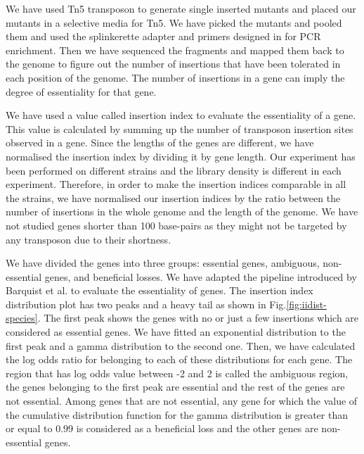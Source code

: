 \documentclass[12pt,letterpaper]{article}
\begin{document}
We have used Tn5 transposon to generate single inserted mutants and placed our mutants in a selective media for Tn5. We have picked the mutants and pooled them and used the splinkerette adapter and primers designed in \cite{barquist_tradis_2016} for PCR enrichment. Then we have sequenced the fragments and mapped them back to the genome to figure out the number of insertions that have been tolerated in each position of the genome. The number of insertions in a gene can imply the degree of essentiality for that gene.

We have used a value called insertion index to evaluate the essentiality of a gene. This value is calculated by summing up the number of transposon insertion sites observed in a gene. Since the lengths of the genes are different, we have normalised the insertion index by dividing it by gene length. Our experiment has been performed on different strains and the library density is different in each experiment. Therefore, in order to make the insertion indices comparable in all the strains, we have normalised our insertion indices by the ratio between the number of insertions in the whole genome and the length of the genome. We have not studied genes shorter than 100 base-pairs as they might not be targeted by any transposon due to their shortness. 

We have divided the genes into three groups: essential genes, ambiguous, non-essential genes, and beneficial losses. We have adapted the pipeline introduced by Barquist et al.\@ \cite{barquist_tradis_2016} to evaluate the essentiality of genes. The insertion index distribution plot has two peaks and a heavy tail as shown in Fig.\@ \ref{fig:iidist-species}. The first peak shows the genes with no or just a few insertions which are considered as essential genes. We have fitted an exponential distribution to the first peak and a gamma distribution to the second one. Then, we have calculated the log odds ratio for belonging to each of these distributions for each gene. The region that has log odds value between -2 and 2 is called the ambiguous region, the genes belonging to the first peak are essential and the rest of the genes are not essential. Among genes that are not essential, any gene for which the value of the cumulative distribution function for the gamma distribution is greater than or equal to 0.99 is considered as a beneficial loss and the other genes are non-essential genes.
\end{document}
